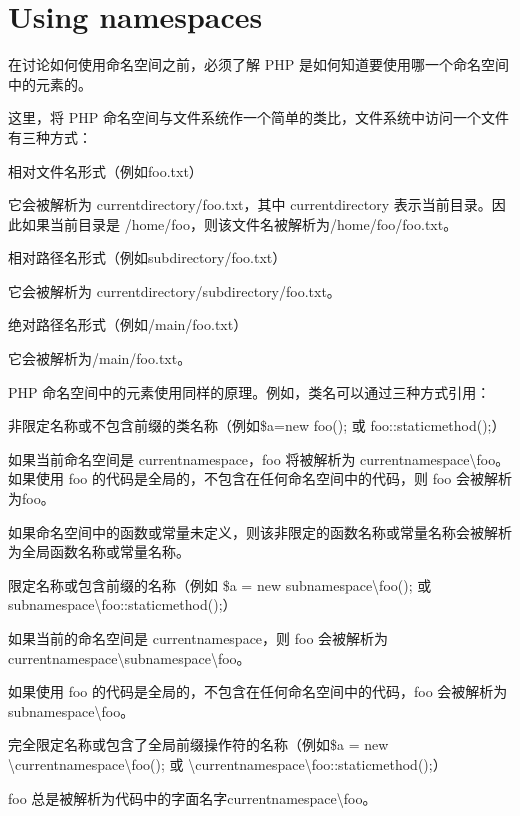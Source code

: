 \chapter{Using namespaces}

在讨论如何使用命名空间之前，必须了解 PHP 是如何知道要使用哪一个命名空间中的元素的。

这里，将 PHP 命名空间与文件系统作一个简单的类比，文件系统中访问一个文件有三种方式：

\begin{compactenum}
\item 相对文件名形式（例如foo.txt）

它会被解析为 currentdirectory/foo.txt，其中 currentdirectory 表示当前目录。因此如果当前目录是 /home/foo，则该文件名被解析为/home/foo/foo.txt。
\item 相对路径名形式（例如subdirectory/foo.txt）

它会被解析为 currentdirectory/subdirectory/foo.txt。
\item 绝对路径名形式（例如/main/foo.txt）

它会被解析为/main/foo.txt。
\end{compactenum}

PHP 命名空间中的元素使用同样的原理。例如，类名可以通过三种方式引用：

\begin{compactenum}
\item 非限定名称或不包含前缀的类名称（例如\$a=new foo(); 或 foo::staticmethod();）

如果当前命名空间是 currentnamespace，foo 将被解析为 currentnamespace\textbackslash foo。如果使用 foo 的代码是全局的，不包含在任何命名空间中的代码，则 foo 会被解析为foo。 

如果命名空间中的函数或常量未定义，则该非限定的函数名称或常量名称会被解析为全局函数名称或常量名称。

\item 限定名称或包含前缀的名称（例如 \$a = new subnamespace\textbackslash foo(); 或 subnamespace\textbackslash foo::staticmethod();）

如果当前的命名空间是 currentnamespace，则 foo 会被解析为 currentnamespace\textbackslash subnamespace\textbackslash foo。

如果使用 foo 的代码是全局的，不包含在任何命名空间中的代码，foo 会被解析为subnamespace\textbackslash foo。
\item 完全限定名称或包含了全局前缀操作符的名称（例如\$a = new \textbackslash currentnamespace\textbackslash foo(); 或 \textbackslash currentnamespace\textbackslash foo::staticmethod();）

foo 总是被解析为代码中的字面名字currentnamespace\textbackslash foo。
\end{compactenum}

